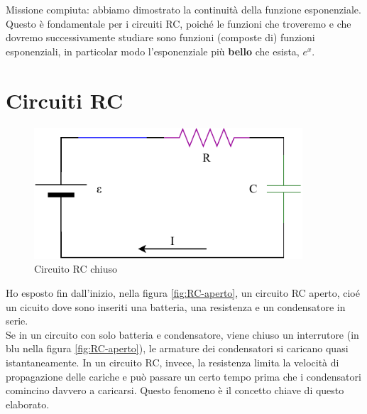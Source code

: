 \documentclass[a3paper, twoside, openany]{book}
\theoremstyle{definition}
\begin{document}
Missione compiuta: abbiamo dimostrato la continuità della funzione esponenziale. Questo è fondamentale per i circuiti RC, poiché le funzioni che troveremo e che dovremo successivamente studiare sono funzioni (composte di) funzioni esponenziali, in particolar modo l'esponenziale più \textbf{bello} che esista, $e^x$.



\section{Circuiti RC}
\begin{figure}[htp]
    \centering
    \includegraphics[width=10cm]{Circuito RC-chiuso}
    \caption{Circuito RC chiuso}
    \label{fig:RC-chiuso}
\end{figure}

Ho esposto fin dall'inizio, nella figura \ref{fig:RC-aperto}, un circuito RC aperto, cioé un cicuito dove sono inseriti una batteria, una resistenza e un condensatore in serie. \\ Se in un circuito con solo batteria e condensatore, viene chiuso un interrutore (in blu nella figura \ref{fig:RC-aperto}), le armature dei condensatori si caricano quasi istantaneamente. In un circuito RC, invece, la resistenza limita la velocità di propagazione delle cariche e può passare un certo tempo prima che i condensatori comincino davvero a caricarsi. Questo fenomeno è il concetto chiave di questo elaborato.
\end{document}
